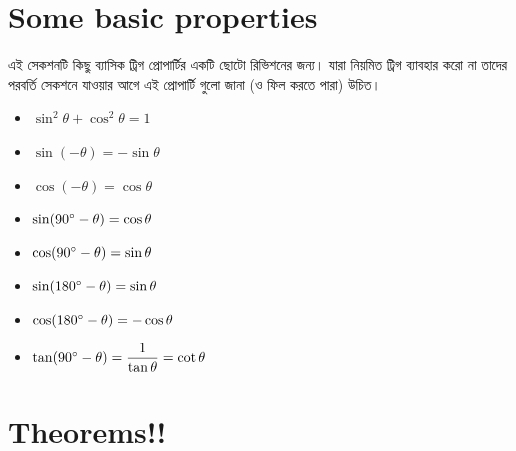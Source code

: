 \documentclass[12pt]{article}
\begin{document}


\section{Some basic properties}
এই সেকশনটি কিছু ব্যাসিক ট্রিগ প্রোপার্টির একটি ছোটো রিভিশনের জন্য। যারা নিয়মিত ট্রিগ ব্যাবহার করো না তাদের 
পরবর্তি সেকশনে যাওয়ার আগে এই প্রোপার্টি গুলো জানা (ও ফিল করতে পারা) উচিত।
\begin{theom*}
    \begin{itemize}
        \item $\sin^2 \theta + \cos^2 \theta = 1$
        \item $\sin(-\theta) = -\sin\theta$
        \item $\cos(-\theta) = \cos\theta$
        \item $\sin(90^\circ - \theta) = \cos\theta$
        \item $\cos(90^\circ - \theta) = \sin\theta$
        \item $\sin(180^\circ - \theta) = \sin\theta$
        \item $\cos(180^\circ - \theta) = -\cos\theta$
        \item $\tan(90^\circ - \theta) = \dfrac{1}{\tan\theta} = \cot \theta$
    \end{itemize}
\end{theom*}





\section{Theorems!!}
\end{document}
